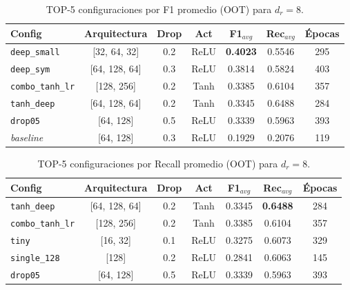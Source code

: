 \documentclass[11pt,a4paper]{article}
\begin{document}
\begin{table}[H]
\centering
\caption{TOP-5 configuraciones por F1 promedio (OOT) para $d_r=8$.}
\label{tab:top5_f1_rdim8}
\begin{tabular}{lcccccc}
\toprule
\textbf{Config} & \textbf{Arquitectura} & \textbf{Drop} & \textbf{Act} & \textbf{F1$_{avg}$} & \textbf{Rec$_{avg}$} & \textbf{Épocas} \\
\midrule
\texttt{deep\_small} & [32, 64, 32]  & 0.2 & ReLU  & \textbf{0.4023} & 0.5546 & 295 \\
\texttt{deep\_sym}   & [64, 128, 64] & 0.3 & ReLU  & 0.3814 & 0.5824 & 403 \\
\texttt{combo\_tanh\_lr} & [128, 256] & 0.2 & Tanh & 0.3385 & 0.6104 & 357 \\
\texttt{tanh\_deep}  & [64, 128, 64] & 0.2 & Tanh  & 0.3345 & 0.6488 & 284 \\
\texttt{drop05}      & [64, 128]    & 0.5 & ReLU  & 0.3339 & 0.5963 & 393 \\
\midrule
\textit{baseline}    & [64, 128]    & 0.3 & ReLU  & 0.1929 & 0.2076 & 119 \\
\bottomrule
\end{tabular}
\end{table}

\begin{table}[H]
\centering
\caption{TOP-5 configuraciones por Recall promedio (OOT) para $d_r=8$.}
\label{tab:top5_rec_rdim8}
\begin{tabular}{lcccccc}
\toprule
\textbf{Config} & \textbf{Arquitectura} & \textbf{Drop} & \textbf{Act} & \textbf{F1$_{avg}$} & \textbf{Rec$_{avg}$} & \textbf{Épocas} \\
\midrule
\texttt{tanh\_deep}      & [64, 128, 64] & 0.2 & Tanh & 0.3345 & \textbf{0.6488} & 284 \\
\texttt{combo\_tanh\_lr} & [128, 256]    & 0.2 & Tanh & 0.3385 & 0.6104 & 357 \\
\texttt{tiny}            & [16, 32]     & 0.1 & ReLU & 0.3275 & 0.6073 & 329 \\
\texttt{single\_128}     & [128]        & 0.2 & ReLU & 0.2841 & 0.6063 & 145 \\
\texttt{drop05}          & [64, 128]    & 0.5 & ReLU & 0.3339 & 0.5963 & 393 \\
\bottomrule
\end{tabular}
\end{table}
\end{document}
